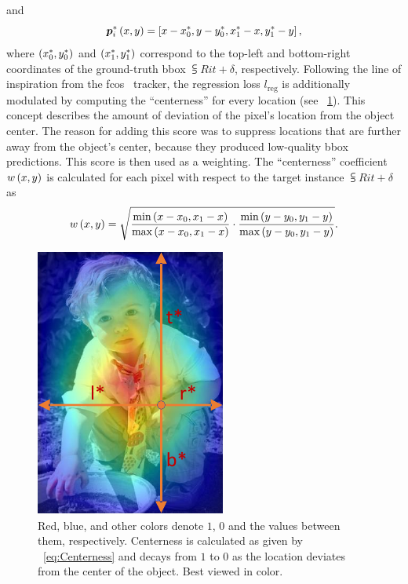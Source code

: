 and
\begin{equation}
    {\bm{p}_{i}^{*}} \left( x, y \right) =
    \left[ {
        x - {x}_{0}^{*},
        y - {y}_{0}^{*},
        {x}_{1}^{*} - x,
        {y}_{1}^{*} - y
    } \right],
\end{equation}
where $\left( {{x}_{0}^{*}, {y}_{0}^{*}} \right)$ and $\left( {{x}_{1}^{*}, {y}_{1}^{*}} \right)$ correspond to the top-left and bottom-right coordinates of the ground-truth \gls{bbox} $\subsup{R}{i}{t + \delta}$, respectively. Following the line of inspiration from the \gls{fcos}~\cite{tian2019fcos} tracker, the regression loss $l_{\text{reg}}$ is additionally modulated by computing the ``centerness'' for every location (see \figtext{}~\ref{fig:FCOSCenterness}). This concept describes the amount of deviation of the pixel's location from the object center. The reason for adding this score was to suppress locations that are further away from the object's center, because they produced low-quality \gls{bbox} predictions. This score is then used as a weighting. The ``centerness'' coefficient ${w} \left( x, y \right)$ is calculated for each pixel with respect to the target instance $\subsup{R}{i}{t + \delta}$ as
\begin{equation}
    \label{eq:Centerness}
    {w} \left( x, y \right) =
    \sqrt{
        \frac{\text{min} \left( x - x_0, x_1 - x \right)}{\text{max} \left( x - x_0, x_1 - x \right)}
        \cdot
        \frac{\text{min} \left( y - y_0, y_1 - y \right)}{\text{max} \left( y - y_0, y_1 - y \right)}
    }.
\end{equation}

\begin{figure}[t]
    \centerline{\includegraphics[width=0.2\linewidth]{figures/siamese_tracking/fcos_centerness.pdf}}
    \caption[Centerness visualization]{Red, blue, and other colors denote $1$, $0$ and the values between them, respectively. Centerness is calculated as given by \eqtext{}~\ref{eq:Centerness} and decays from $1$ to $0$ as the location deviates from the center of the object. Best viewed in color. }
    \label{fig:FCOSCenterness}
\end{figure}

